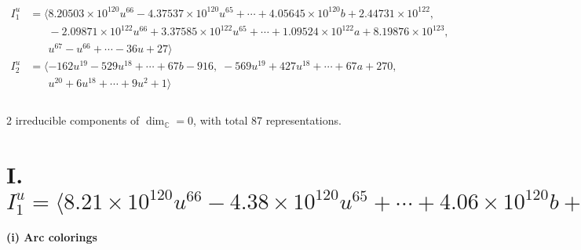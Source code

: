 \documentclass[1p]{elsarticle_modified}
\theoremstyle{definition}
\begin{document}
\begin{align*}
I^u_{1}&=\langle 
8.20503\times10^{120} u^{66}-4.37537\times10^{120} u^{65}+\cdots+4.05645\times10^{120} b+2.44731\times10^{122},\\
\phantom{I^u_{1}}&\phantom{= \langle  }-2.09871\times10^{122} u^{66}+3.37585\times10^{122} u^{65}+\cdots+1.09524\times10^{122} a+8.19876\times10^{123},\\
\phantom{I^u_{1}}&\phantom{= \langle  }u^{67}- u^{66}+\cdots-36 u+27\rangle \\
I^u_{2}&=\langle 
-162 u^{19}-529 u^{18}+\cdots+67 b-916,\;-569 u^{19}+427 u^{18}+\cdots+67 a+270,\\
\phantom{I^u_{2}}&\phantom{= \langle  }u^{20}+6 u^{18}+\cdots+9 u^2+1\rangle \\
\\
\end{align*}
\raggedright * 2 irreducible components of $\dim_{\mathbb{C}}=0$, with total 87 representations.\\
\newpage
\renewcommand{\arraystretch}{1}
\centering \section*{I. $I^u_{1}= \langle 8.21\times10^{120} u^{66}-4.38\times10^{120} u^{65}+\cdots+4.06\times10^{120} b+2.45\times10^{122},\;-2.10\times10^{122} u^{66}+3.38\times10^{122} u^{65}+\cdots+1.10\times10^{122} a+8.20\times10^{123},\;u^{67}- u^{66}+\cdots-36 u+27 \rangle$}
\flushleft \textbf{(i) Arc colorings}\\
\end{document}
